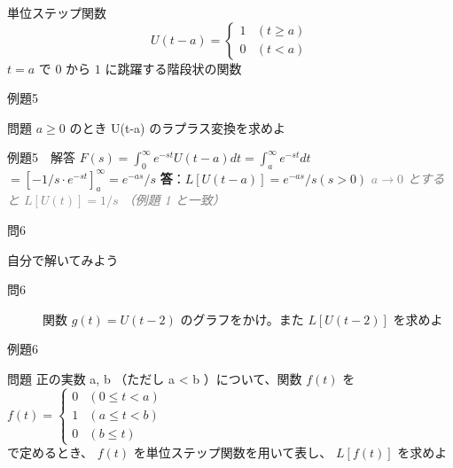 \documentclass[professionalfonts]{beamer}
\begin{document}
\begin{frame}{単位ステップ関数}
  \[
    U(t-a) = \begin{cases} 1 & (t \geq a) \\ 0 & (t < a) \end{cases}
  \]
  $t = a$ で $0$ から $1$ に跳躍する階段状の関数
\end{frame}

\begin{frame}{例題5}
  \begin{exampleblock}{問題}
    $a \geq 0$ のとき U(t-a) のラプラス変換を求めよ\\[2pt]
  \end{exampleblock}
\end{frame}

\begin{frame}{例題5　解答}
  $F(s) = \int_{0}^\infty e^{-st}U(t-a)dt = \int_{a}^\infty e^{-st}dt$\\[4pt]
  $= [-1/s \cdot e^{-st}]_{a}^\infty = e^{-as}/s$
  \medskip\textbf{答}：$L[U(t-a)] = e^{-as}/s  (s > 0)$
  {\footnotesize \textcolor{gray}{\textit{$a \to 0$ とすると $L[U(t)] = 1/s$ （例題 1 と一致）}}}
\end{frame}

\begin{frame}{問6}
  \begin{exampleblock}{自分で解いてみよう}
  \begin{description}
    \item[問6] 関数 $g(t) = U(t-2)$ のグラフをかけ。また $L[U(t-2)]$ を求めよ
  \end{description}
  \end{exampleblock}
\end{frame}

\begin{frame}{例題6}
  \begin{exampleblock}{問題}
    正の実数 a, b （ただし a < b ）について、関数 $f(t)$ を\\[2pt]
    $f(t) = \begin{cases} 0 & (0 \leq t < a) \\ 1 & (a \leq t < b) \\ 0 & (b \leq t) \end{cases}$\\[2pt]
    で定めるとき、 $f(t)$ を単位ステップ関数を用いて表し、 $L[f(t)]$ を求めよ\\[2pt]
  \end{exampleblock}
\end{frame}
\end{document}
